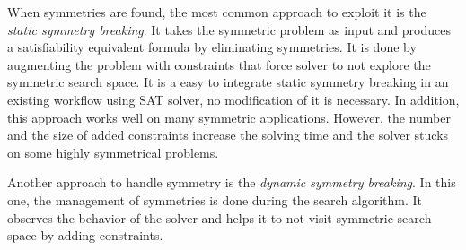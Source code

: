 When symmetries are found, the most common approach to exploit it is the \emph{static symmetry breaking}.
It takes the symmetric problem as input and produces a satisfiability equivalent formula by eliminating symmetries. It is done by augmenting the problem with constraints that force solver to not explore the symmetric search  space. It is a easy to integrate static symmetry breaking in an existing workflow using SAT solver, no modification of it is necessary. In addition, this approach works well on many symmetric applications.
However, the number and the size of added constraints increase the solving time and the solver stucks
on some highly symmetrical problems.

Another approach to handle symmetry is the \emph{dynamic symmetry breaking}. In this one, the management of
symmetries is done during the search algorithm. It observes the behavior of the solver and helps it to
not visit symmetric search space by adding constraints.



%
%
%
%
%
%




